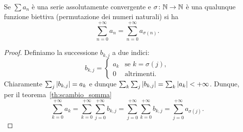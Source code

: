 \begin{theorem}%
\label{th:convergenza_incondizionata}%
\mymark{*}%
%
Se $\sum a_n$ è una serie assolutamente convergente e $\sigma\colon {\mathbb N} \to {\mathbb N}$
è una qualunque funzione biettiva (permutazione dei numeri naturali)
si ha
\[
  \sum_{n=0}^{+\infty} a_n = \sum_{n=0}^{+\infty} a_{\sigma(n)}.
\]
\end{theorem}
\begin{proof}
Definiamo la successione $b_{k,j}$ a due indici:
\[
  b_{k,j} = \begin{cases}
    a_k & \text{se $k=\sigma(j)$},\\
    0 & \text{altrimenti}.
  \end{cases}  
\] 
Chiaramente $\sum_j {\left|b_{k,j}\right|} = a_k$
e dunque $\sum_k \sum_j {\left|b_{k,j}\right|} = \sum_k {\left|a_k\right|} < +\infty$.
Dunque, per il teorema~\ref{th:scambio_somma}
\[
 \sum_{k=0}^{+\infty} a_k 
 = \sum_{k=0}^{+\infty} \sum_{j=0}^{+\infty}b_{k,j}
 = \sum_{j=0}^{+\infty} \sum_{k=0}^{+\infty}b_{k,j}
 = \sum_{j=0}^{+\infty} a_{\sigma(j)}.  
\]
\end{proof}

%

